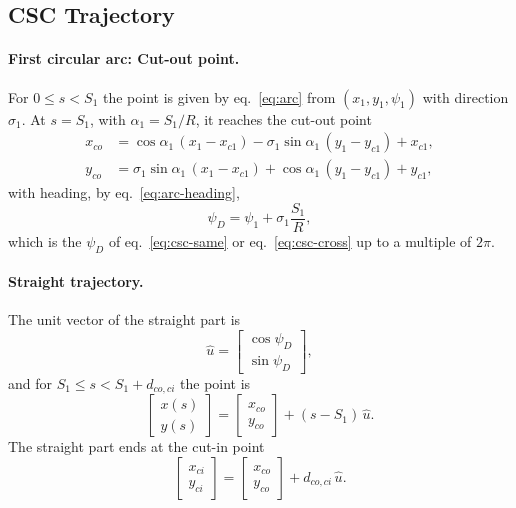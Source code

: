 \documentclass[10pt]{article}
\newcommand{\dcoci}{d_{co,ci}}
\begin{document}
\subsection{CSC Trajectory}

\paragraph{First circular arc: Cut-out point.} For $0 \le s < S_1$ the point is given by eq.~\eqref{eq:arc} from
$(x_1, y_1, \psi_1)$ with direction $\sigma_1$. At $s = S_1$, with $\alpha_1 = S_1 / R$, it reaches the cut-out point
\begin{equation}
  \boxed{
  \begin{aligned}
  x_{co} &= \cos\alpha_1\,(x_1 - x_{c1}) - \sigma_1 \sin\alpha_1\,(y_1 - y_{c1}) + x_{c1},\\
  y_{co} &= \sigma_1 \sin\alpha_1\,(x_1 - x_{c1}) + \cos\alpha_1\,(y_1 - y_{c1}) + y_{c1},
  \end{aligned}}
  \label{eq:cutout}
\end{equation}
with heading, by eq.~\eqref{eq:arc-heading},
\begin{equation}
  \psi_D = \psi_1 + \sigma_1 \frac{S_1}{R},
  \label{eq:psiD-traj}
\end{equation}
which is the $\psi_D$ of eq.~\eqref{eq:csc-same} or eq.~\eqref{eq:csc-cross} up to a multiple of $2\pi$.

\paragraph{Straight trajectory.} The unit vector of the straight part is
\begin{equation}
  \hat{u} = \begin{bmatrix} \cos\psi_D \\ \sin\psi_D \end{bmatrix},
  \label{eq:uhat}
\end{equation}
and for $S_1 \le s < S_1 + \dcoci$ the point is
\begin{equation}
  \begin{bmatrix} x(s) \\ y(s) \end{bmatrix} = \begin{bmatrix} x_{co} \\ y_{co} \end{bmatrix} + (s - S_1)\,\hat{u}.
  \label{eq:straight}
\end{equation}
The straight part ends at the cut-in point
\begin{equation}
  \boxed{
  \begin{bmatrix} x_{ci} \\ y_{ci} \end{bmatrix} = \begin{bmatrix} x_{co} \\ y_{co} \end{bmatrix} + \dcoci\,\hat{u}.}
  \label{eq:cutin}
\end{equation}
\end{document}
